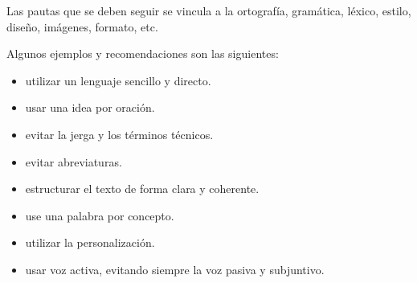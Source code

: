  Las pautas que se deben seguir se vincula a la ortografía, gramática, léxico, estilo, diseño, imágenes, formato, etc. 
 
 Algunos ejemplos y recomendaciones son las siguientes:
 \begin{itemize}
 	
 	\item utilizar un lenguaje sencillo y directo.
 	\item usar una idea por oración.
 	\item evitar la jerga y los términos técnicos.
 	\item evitar abreviaturas.
 	\item estructurar el texto de forma clara y coherente.
	 \item use una palabra por concepto.
 	\item utilizar la personalización.
 	\item usar voz activa, evitando siempre la voz pasiva y subjuntivo.
 	

\end{itemize}
